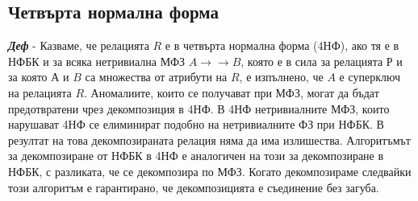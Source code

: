 \documentclass[fleqn,12pt]{article}
\begin{document}
\subsection{Четвърта нормална форма}

\textbf{\textit{Деф}} - Казваме, че релацията $R$ е в четвърта нормална форма (4НФ), ако тя е в НФБК и за всяка нетривиална МФЗ $A \rightarrow \rightarrow B$, която е в сила за релацията $Р$ и за която $А$ и $B$ са множества от атрибути на $R$, е изпълнено, че $A$ е суперключ на релацията $R$.
\bigbreak
Аномалиите, които се получават при МФЗ, могат да бъдат предотвратени чрез декомпозиция в 4НФ.
В 4НФ нетривиалните МФЗ, които нарушават 4НФ се елиминират подобно на нетривиалните ФЗ при НФБК.
В резултат на това декомпозираната релация няма да има излишества.
\bigbreak
Алгоритъмът за декомпозиране от НФБК в 4НФ е аналогичен на този за декомпозиране в НФБК, с разликата, че се декомпозира по МФЗ.
Когато декомпозираме следвайки този алгоритъм е гарантирано, че декомпозицията е съединение без загуба.
\end{document}
